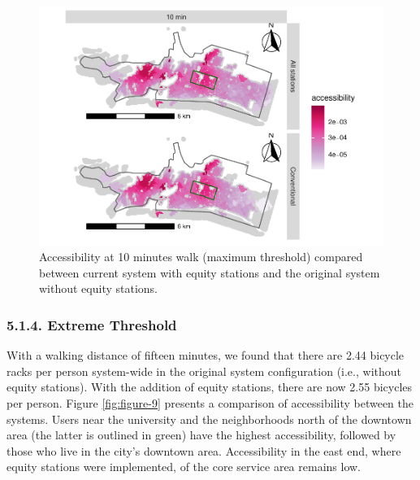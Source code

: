 \documentclass[]{elsarticle} %
\begin{document}
\begin{figure}

{\centering \includegraphics[width=0.9\linewidth]{Bike-share-spatial-equity_files/figure-latex/figure-8-1} 

}

\caption{Accessibility at 10 minutes walk (maximum threshold) compared between current system with equity stations and the original system without equity stations.}\label{fig:figure-8}
\end{figure}

\hypertarget{extreme-threshold}{%
\subsubsection{5.1.4. Extreme Threshold}\label{extreme-threshold}}

With a walking distance of fifteen minutes, we found that there are 2.44
bicycle racks per person system-wide in the original system
configuration (i.e., without equity stations). With the addition of
equity stations, there are now 2.55 bicycles per person. Figure
\ref{fig:figure-9} presents a comparison of accessibility between the
systems. Users near the university and the neighborhoods north of the
downtown area (the latter is outlined in green) have the highest
accessibility, followed by those who live in the city's downtown area.
Accessibility in the east end, where equity stations were implemented,
of the core service area remains low.
\end{document}
